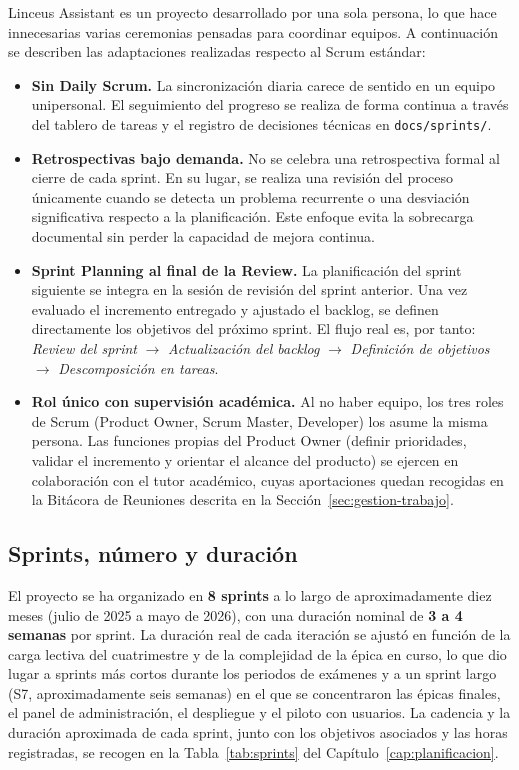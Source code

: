Linceus Assistant es un proyecto desarrollado por una sola persona, lo que hace innecesarias varias ceremonias pensadas para coordinar equipos. A continuación se describen las adaptaciones realizadas respecto al Scrum estándar:

\begin{itemize}
    \item \textbf{Sin Daily Scrum.} La sincronización diaria carece de sentido en un equipo unipersonal. El seguimiento del progreso se realiza de forma continua a través del tablero de tareas y el registro de decisiones técnicas en \texttt{docs/sprints/}.

    \item \textbf{Retrospectivas bajo demanda.} No se celebra una retrospectiva formal al cierre de cada sprint. En su lugar, se realiza una revisión del proceso únicamente cuando se detecta un problema recurrente o una desviación significativa respecto a la planificación. Este enfoque evita la sobrecarga documental sin perder la capacidad de mejora continua.

    \item \textbf{Sprint Planning al final de la Review.} La planificación del sprint siguiente se integra en la sesión de revisión del sprint anterior. Una vez evaluado el incremento entregado y ajustado el backlog, se definen directamente los objetivos del próximo sprint. El flujo real es, por tanto: \textit{Review del sprint} $\rightarrow$ \textit{Actualización del backlog} $\rightarrow$ \textit{Definición de objetivos} $\rightarrow$ \textit{Descomposición en tareas}.

    \item \textbf{Rol único con supervisión académica.} Al no haber equipo, los tres roles de Scrum (Product Owner, Scrum Master, Developer) los asume la misma persona. Las funciones propias del Product Owner (definir prioridades, validar el incremento y orientar el alcance del producto) se ejercen en colaboración con el tutor académico, cuyas aportaciones quedan recogidas en la Bitácora de Reuniones descrita en la Sección~\ref{sec:gestion-trabajo}.
\end{itemize}

\subsection{Sprints, número y duración}

El proyecto se ha organizado en \textbf{8 sprints} a lo largo de aproximadamente diez meses (julio de 2025 a mayo de 2026), con una duración nominal de \textbf{3 a 4 semanas} por sprint. La duración real de cada iteración se ajustó en función de la carga lectiva del cuatrimestre y de la complejidad de la épica en curso, lo que dio lugar a sprints más cortos durante los periodos de exámenes y a un sprint largo (S7, aproximadamente seis semanas) en el que se concentraron las épicas finales, el panel de administración, el despliegue y el piloto con usuarios. La cadencia y la duración aproximada de cada sprint, junto con los objetivos asociados y las horas registradas, se recogen en la Tabla~\ref{tab:sprints} del Capítulo~\ref{cap:planificacion}.

